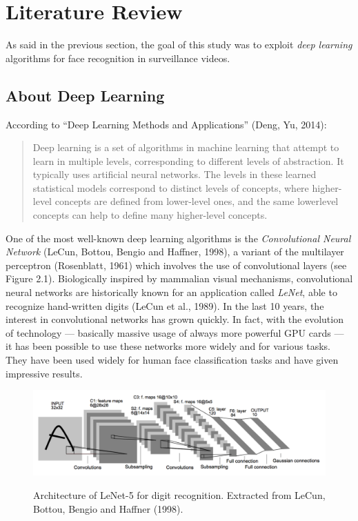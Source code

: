 \setlength{\footskip}{8mm}

\chapter{Literature Review} 
\protect\label{ch:literature-review}

As said in the previous section, the goal of this study was to exploit \textit{deep learning} algorithms for face recognition in surveillance videos.

\section{About Deep Learning}
\protect\label{Main-keywords-of-the-topic}
According to \enquote{Deep Learning Methods and Applications} (Deng, Yu, 2014):

\blockquote{Deep learning is a set of algorithms in machine
learning that attempt to learn in multiple levels, corresponding
to different levels of abstraction. It typically uses artificial
neural networks. The levels in these learned statistical models
correspond to distinct levels of concepts, where higher-level concepts
are defined from lower-level ones, and the same lowerlevel
concepts can help to define many higher-level concepts.}

One of the most well-known deep learning algorithms is the \textit{Convolutional Neural Network} (LeCun, Bottou, Bengio and Haffner, 1998), a variant of the multilayer perceptron (Rosenblatt, 1961) which involves the use of convolutional layers (see Figure 2.1). Biologically inspired by mammalian visual mechanisms, convolutional neural networks are historically known for an application called \textit{LeNet}, able to recognize hand-written digits (LeCun et al., 1989). In the last 10 years, the interest in convolutional networks has grown quickly. In fact, with the evolution of technology --- basically massive usage of always more powerful GPU cards --- it has been possible to use these networks more widely and for various tasks. They have been used widely for human face classification tasks and have given impressive results.

\begin{figure}[!ht]
  \centering
  \includegraphics[scale=0.4]{figures/lenet.png}  
  \caption[Architecture of LeNet-5 for digit recognition. Extracted from LeCun, Bottou, Bengio and Haffner (1998).]{Architecture of LeNet-5 for digit recognition. Extracted from LeCun, Bottou, Bengio and Haffner (1998).}
  \protect\label{fig:lenet}
\end{figure}

